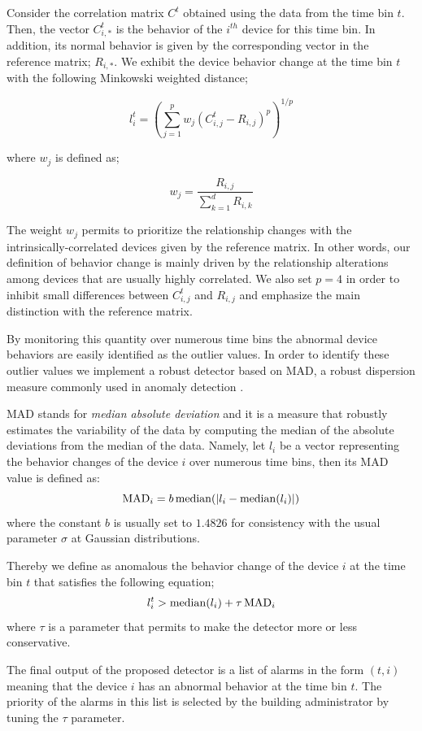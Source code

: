 Consider the correlation matrix $C^t$ obtained using the data from the time bin $t$.
Then, the vector $C^t_{i,*}$ is the behavior of the $i^{th}$ device for this time bin.
In addition, its normal behavior is given by the corresponding vector in the reference matrix; $R_{i,*}$.
We exhibit the device behavior change at the time bin $t$ with the following Minkowski weighted distance;

\[ l^t_{i} = \left(\sum_{j=1}^p  w_j\left(C^t_{i,j} - R_{i,j}\right)^p\right)^{1/p} \]

where $w_j$ is defined as;

\[ w_j = \frac{R_{i,j}}{\sum_{k=1}^d R_{i,k}} \]

The weight $w_j$ permits to prioritize the relationship changes with the intrinsically-correlated devices given by the reference matrix.
In other words, our definition of behavior change is mainly driven by the relationship alterations among devices that are usually highly correlated.
We also set $p=4$ in order to inhibit small differences between $C^t_{i,j}$ and $R_{i,j}$ and emphasize the main distinction with the reference matrix.

By monitoring this quantity over numerous time bins the abnormal device behaviors are easily identified as the outlier values.
In order to identify these outlier values we implement a robust detector based on MAD, a robust dispersion measure commonly used in anomaly detection \cite{huber:wiley2009,chan:springer2005}.

MAD stands for \emph{median absolute deviation} and it is a measure that robustly estimates the variability of the data by computing the median of the absolute deviations from the median of the data.
Namely, let $l_{i}$ be a vector representing the behavior changes of the device $i$ over numerous time bins, then its MAD value is defined as:
\[ \operatorname{MAD}_i = b \operatorname{median}(\lvert l_{i} - \operatorname{median}(l_{i})\rvert)\]
where the constant $b$ is usually set to $1.4826$ for consistency with the usual parameter $\sigma$ at Gaussian distributions.

Thereby we define as anomalous the behavior change of the device $i$ at the time bin $t$ that satisfies the following equation;
\[l^t_{i} > \operatorname{median}(l_{i}) + \tau  \operatorname{MAD}_i\]
where $\tau$ is a parameter that permits to make the detector more or less conservative.

The final output of the proposed detector is a list of alarms in the form $(t,i)$ meaning that the device $i$ has an abnormal behavior at the time bin $t$.
The priority of the alarms in this list is selected by the building administrator by tuning the $\tau$ parameter.
